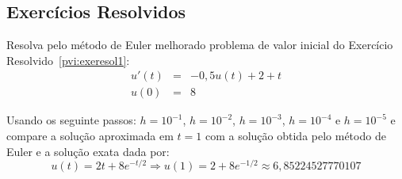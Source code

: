 \subsection*{Exercícios Resolvidos}
\begin{exeresol}\label{pvi:exeresol1_euler_melhorado} Resolva pelo método de Euler melhorado problema de valor inicial do Exercício Resolvido~\ref{pvi:exeresol1}:
\begin{eqnarray}
     u'(t)&=& -0,5u(t)+2+t\\
            u(0) &=&  8
\end{eqnarray}

Usando os seguinte passos: $h=10^{-1}$, $h=10^{-2}$, $h=10^{-3}$, $h=10^{-4}$ e $h=10^{-5}$ e compare a solução aproximada em $t=1$ com a solução obtida pelo método de Euler e a solução exata dada por:
\begin{equation*}
     u(t) = 2t+8e^{-t/2} \Longrightarrow u(1)=2+8e^{-1/2} \approx 6,85224527770107
\end{equation*}
\end{exeresol}
